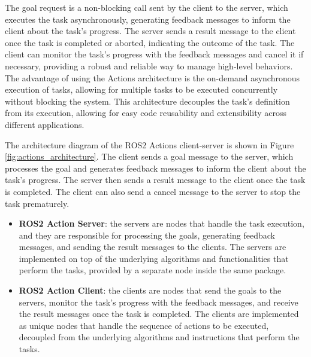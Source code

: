 The goal request is a non-blocking call sent by the client to the server, which executes the task asynchronously,
generating feedback messages to inform the client about the task's progress. The server sends a result message
to the client once the task is completed or aborted, indicating the outcome of the task.
The client can monitor the task's progress with the feedback messages and cancel it if necessary, providing a robust 
and reliable way to manage high-level behaviors. The advantage of using the Actions architecture is the on-demand
asynchronous execution of tasks, allowing for multiple tasks to be executed concurrently without blocking the system.
This architecture decouples the task's definition from its execution, allowing for easy code reusability and extensibility
across different applications. 

The architecture diagram of the ROS2 Actions client-server is shown in Figure \ref{fig:actions_architecture}.
The client sends a goal message to the server, which processes the goal and generates feedback messages
to inform the client about the task's progress. The server then sends a result message to the client
once the task is completed. The client can also send a cancel message to the server to stop the task
prematurely.

\begin{itemize}
    \item \textbf{ROS2 Action Server}: the servers are nodes that handle the task execution, and they are responsible
    for processing the goals, generating feedback messages, and sending the result messages to the clients.
    The servers are implemented on top of the underlying algorithms and functionalities that perform the tasks,
    provided by a separate node inside the same package.
    \item \textbf{ROS2 Action Client}: the clients are nodes that send the goals to the servers, monitor the task's progress
    with the feedback messages, and receive the result messages once the task is completed. The clients are implemented
    as unique nodes that handle the sequence of actions to be executed, decoupled from the underlying algorithms
    and instructions that perform the tasks.
\end{itemize}



